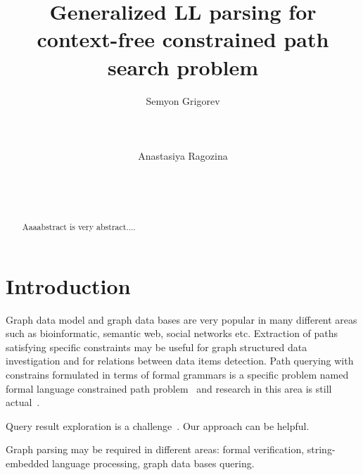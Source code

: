 \documentclass{sig-alternate} %
\begin{document}
\makeatletter
\def\@copyrightspace{\relax}
\makeatother

\title{Generalized LL parsing for context-free constrained path search problem}

\sloppy


\author{
\alignauthor
       Semyon Grigorev\\
       \\
       \\
       \\
\alignauthor
       Anastasiya Ragozina\\
       \\
       \\
       \\
}

\maketitle

\begin{abstract}
Aaaabstract is very abstract....

\end{abstract}

\section{Introduction}
Graph data model and graph data bases are very popular in many different areas such as bioinformatic, semantic web, social networks etc.
Extraction of paths satisfying specific constraints may be useful for graph structured data investigation and for relations between data items detection.
Path querying with constrains formulated in terms of formal grammars is a specific problem named formal language constrained path problem~\cite{FLCpathProblem} and research in this area is still actual~\cite{DirOfBigGraphAnalysis}.

Query result exploration is a challenge~\cite{hofman2015separabilityForRegQueryDebugging}. Our approach can be helpful.

Graph parsing may be required in different areas: formal verification, string-embedded language processing, graph data bases quering.
\end{document}
